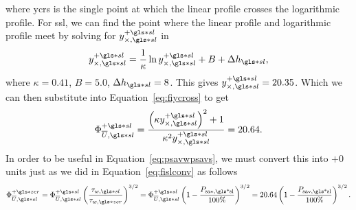 where \gls*{ycrs} is the single point at which the linear profile crosses the logarithmic profile. For \gls*{ssl}, we can find the point where the linear profile and logarithmic profile meet by solving for $y_{\times,\gls*{sl}}\ps$ in
\begin{equation}
	y_{\times,\gls*{sl}}\ps=\frac{1}{\kappa}\ln  y_{\times,\gls*{sl}}\ps +B+\Delta h\ssl
,\end{equation}
where $\kappa=0.41$,  $B=5.0$,  $\Delta h\ssl=8$. This gives  $y_{\times,\gls*{sl}}\ps = 20.35$. Which we can then substitute into Equation~\ref{eq:fiycross} to get
\begin{equation}
	\Phi _{\overline{U},\gls*{sl}}\ps = \frac{\left(  \kappa y_{\times,\gls*{sl}}\ps  \right) ^2+ 1}{\kappa^2 y_{\times,\gls*{sl}}\ps}=20.64
.\end{equation}
In order to be useful in Equation~\eqref{eq:psavwpsavs}, we must convert this into $+0$ units just as we did in Equation~\eqref{eq:fislconv} as follows
\begin{equation}
	\Phi _{\overline{U},\gls*{sl}}\pz=\Phi _{\overline{U},\gls*{sl}}\ps \left( \frac{\tau_{w,\gls*{sl}}}{\tau_{w,\gls*{zer}}} \right) ^{3 /2} =\Phi _{\overline{U},\gls*{sl}}\ps \left( 1-\frac{P_\text{sav,\gls*{sl}} }{100\%}\right) ^{3 /2} =20.64\left( 1-\frac{P_\text{sav,\gls*{sl}} }{100\%}\right) ^{3 /2} 
.\end{equation}

